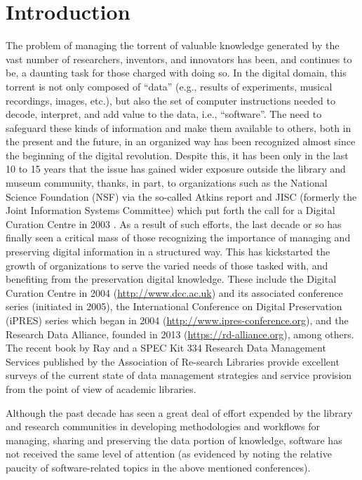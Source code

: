 \documentclass[letterpaper,11pt]{article}
\begin{document}
\section{Introduction}
The problem of managing the torrent of valuable knowledge generated by the vast number of researchers, inventors, and innovators has been, and continues to be, a daunting task for those charged with doing so.  In the digital domain, this torrent is not only composed of ``data'' (e.g., results of experiments, musical recordings, images, etc.), but also the set of computer instructions needed to decode, interpret, and add value to the data, i.e., ``software''. The need to safeguard these kinds of information and make them available to others, both in the present and the future, in an organized way has been recognized almost since the beginning of the digital revolution. Despite this, it has been only in the last 10 to 15 years that the issue has gained wider exposure outside the library and museum community, thanks, in part, to organizations such as the National Science Foundation (NSF) via the so-called Atkins report \citep{atkins2003} and JISC (formerly the Joint Information Systems Committee) which put forth the call for a Digital Curation Centre in 2003 \citep{rusbridge2005}. As a result of such efforts, the last decade or so has finally seen a critical mass of those recognizing the importance of managing and preserving digital information in a structured way. This has kickstarted the growth of organizations to serve the varied needs of those tasked with, and benefiting from the preservation digital knowledge. These include the Digital Curation Centre in 2004 (\url{http://www.dcc.ac.uk}) and its associated conference series (initiated in 2005), the International Conference on Digital Preservation (iPRES) series which began in 2004 (\url{http://www.ipres-conference.org}), and the Research Data Alliance, founded in 2013 (\url{https://rd-alliance.org}), among others. The recent book by Ray \citep{ray2014} and a SPEC Kit 334 Research Data Management Services published by the Association of Re-search Libraries \citep{fearon2013} provide excellent surveys of the current state of data management strategies and service provision from the point of view of academic libraries.

Although the past decade has seen a great deal of effort expended by the library and research communities in developing methodologies and workflows for managing, sharing and preserving the data portion of knowledge, software has not received the same level of attention (as evidenced by noting the relative paucity of software-related topics in the above mentioned conferences).
\end{document}
